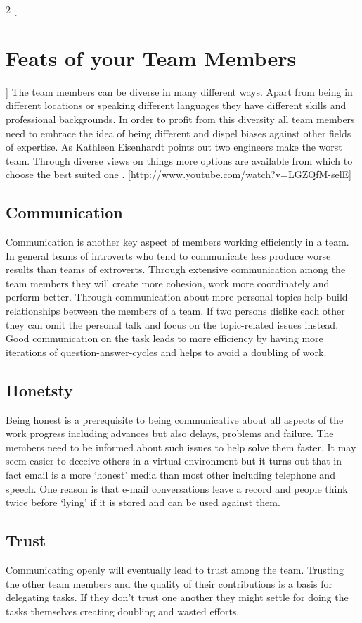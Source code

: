 \begin{multicols}{2}
[\section{Feats of your Team Members}]
The team members can be diverse in many different ways. Apart from being in different locations or speaking different languages they have different skills and professional backgrounds. In order to profit from this diversity all team members need to embrace the idea of being different and dispel biases against other fields of expertise. As Kathleen Eisenhardt points out two engineers make the worst team. Through diverse views on things more options are available from which to choose the best suited one \cite{eisenhardt}. [http://www.youtube.com/watch?v=LGZQfM-selE]

\subsection{Communication}
Communication is another key aspect of members working efficiently in a team. In general teams of introverts who tend to communicate less produce worse results than teams of extroverts. Through extensive communication among the team members they will create more cohesion, work more coordinately and perform better. Through communication about more personal topics help build relationships between the members of a team. If two persons dislike each other they can omit the personal talk and focus on the topic-related issues instead. Good communication on the task leads to more efficiency by having more iterations of question-answer-cycles and helps to avoid a doubling of work\cite{belbin1996management}.

\subsection{Honetsty}
Being honest is a prerequisite to being communicative about all aspects of the work progress including advances but also delays, problems and failure. The members need to be informed about such issues to help solve them faster. It may seem easier to deceive others in a virtual environment but it turns out that in fact email is a more ‘honest’ media than most other including telephone and speech. One reason is that e-mail conversations leave a record and people think twice before ‘lying’ if it is stored and can be used against them\cite{TED}.

\subsection{Trust}
Communicating openly will eventually lead to trust among the team. Trusting the other team members and the quality of their contributions is a basis for delegating tasks. If they don’t trust one another they might settle for doing the tasks themselves creating doubling and wasted efforts.


\end{multicols}
